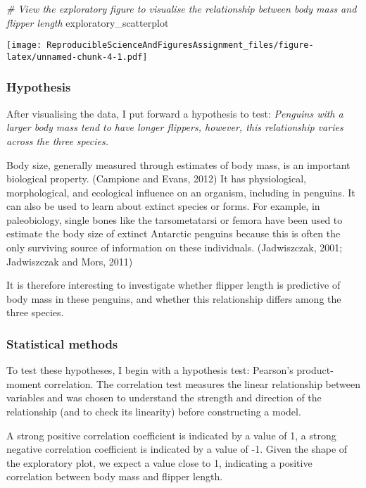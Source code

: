 \documentclass[
]{article}
\newenvironment{Shaded}{\begin{snugshade}}{\end{snugshade}}
\newcommand{\CommentTok}[1]{\textcolor[rgb]{0.56,0.35,0.01}{\textit{#1}}}
\newcommand{\NormalTok}[1]{#1}
\begin{document}
\begin{Shaded}
\begin{Highlighting}[]
\CommentTok{\# View the exploratory figure to visualise the relationship between body mass and flipper length}
\NormalTok{exploratory\_scatterplot}
\end{Highlighting}
\end{Shaded}

\texttt{[image: ReproducibleScienceAndFiguresAssignment\_files/figure-latex/unnamed-chunk-4-1.pdf]}

\subsubsection{Hypothesis}\label{hypothesis}

After visualising the data, I put forward a hypothesis to test:
\emph{Penguins with a larger body mass tend to have longer flippers,
however, this relationship varies across the three species.}

Body size, generally measured through estimates of body mass, is an
important biological property. (Campione and Evans, 2012) It has
physiological, morphological, and ecological influence on an organism,
including in penguins. It can also be used to learn about extinct
species or forms. For example, in paleobiology, single bones like the
tarsometatarsi or femora have been used to estimate the body size of
extinct Antarctic penguins because this is often the only surviving
source of information on these individuals. (Jadwiszczak, 2001;
Jadwiszczak and Mors, 2011)

It is therefore interesting to investigate whether flipper length is
predictive of body mass in these penguins, and whether this relationship
differs among the three species.

\subsubsection{Statistical methods}\label{statistical-methods}

To test these hypotheses, I begin with a hypothesis test: Pearson's
product-moment correlation. The correlation test measures the linear
relationship between variables and was chosen to understand the strength
and direction of the relationship (and to check its linearity) before
constructing a model.

A strong positive correlation coefficient is indicated by a value of 1,
a strong negative correlation coefficient is indicated by a value of -1.
Given the shape of the exploratory plot, we expect a value close to 1,
indicating a positive correlation between body mass and flipper length.
\end{document}
